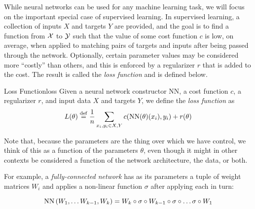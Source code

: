 \documentclass[../../thesis.tex]{subfiles}
\begin{document}
While neural networks can be used for any machine learning task,
we will focus on the important special case of supervised learning.
In supervised learning, a collection of inputs $X$ and targets $Y$
are provided, and the goal is to find a function from ${\mathcal{X}}$ to ${\mathcal{Y}}$
such that the value of some cost function $c$ is low, on average, when applied to
matching pairs of targets and inputs
after being passed through the network.
Optionally, certain parameter values may be considered more \enquote{costly}
than others, and this is enforced by a regularizer $r$
that is added to the cost.
The result is called the \emph{loss function}
and is defined below.
\begin{definition}{Loss Function}{loss}
	Given a neural network constructor $\mathrm{NN}$,
	a cost function $c$,
	a regularizer $r$,
	and input data $X$ and targets $Y$,
	we define the \emph{loss function} as
	\begin{equation}\equationlabel{def-loss}
		L(\theta) \defeq
		\frac{1}{n}\sum_{x_i, y_i \in X, Y}
			c(\mathrm{NN}(\theta)(x_i), y_i) + r(\theta)
	\end{equation}
\end{definition}
Note that,
because the parameters are the thing over which we have control,
we think of this as a function of the parameters $\theta$,
even though it might in other contexts be considered
a function of the network architecture, the data, or both.

For example,
a \emph{fully-connected network}
has as its parameters a tuple of weight matrices $W_i$
and applies a non-linear function $\sigma$
after applying each in turn:

\begin{equation}
	\mathrm{NN}\left(W_1, \dots W_{k-1}, W_k\right)
	= W_k \circ \sigma \circ W_{k-1} \circ \sigma \circ
	\dots \sigma \circ W_1
\end{equation}
\end{document}

